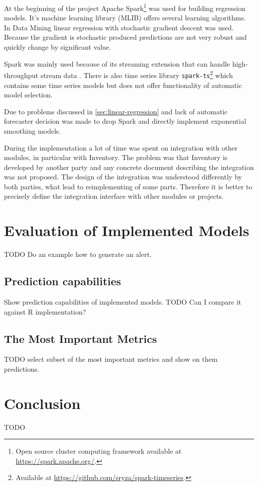     At the beginning of the project Apache Spark\footnote{Open source cluster computing framework available at
    \url{https://spark.apache.org/}.} was used for building regression models. It's machine learning library (MLIB)
    offers several learning algorithms. In Data Mining linear regression with stochastic gradient descent was used.
    Because the gradient is stochastic produced predictions are not very robust and quickly change by significant value.

    Spark was mainly used because of its streaming extension that can handle
    high-throughput stream data \cite{apache-spark}. There is also time series library
    \texttt{spark-ts}\footnote{Available at \url{https://github.com/sryza/spark-timeseries}.} which contains some
    time series models but does not offer functionality of automatic model selection.

    Due to problems discussed in \ref{sec:linear-regression} and lack of automatic forecaster decision was made
    to drop Spark and directly implement exponential smoothing models.

    During the implementation a lot of time was spent on integration with other modules, in particular with Inventory.
    The problem was that Inventory is developed by another party and any concrete document
    describing the integration was not proposed. The design of the integration was understood differently
    by both parties, what lead to reimplementing of some parts. Therefore it is better to precisely define the
    integration interface with other modules or projects.

\chapter{Evaluation of Implemented Models} \label{evaluation}
TODO Do an example how to generate an alert.

    \section{Prediction capabilities}
    Show prediction capabilities of implemented models.
    TODO Can I compare it against R implementation?

    \section{The Most Important Metrics}
    TODO select subset of the most important metrics and show on them predictions.

\chapter{Conclusion}
TODO

\let\cleardoublepage\clearpage
